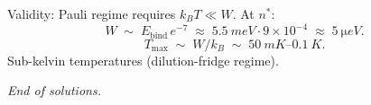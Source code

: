 \documentclass[11pt]{article}
\newcommand{\kB}{k_{B}}
\begin{document}
Validity: Pauli regime requires $\kB T\ll W$. At $n^*$:
\[
W \;\sim\; E_{\text{bind}}\,e^{-7} \;\approx\; \SI{5.5}{meV}\cdot 9\times 10^{-4} \;\approx\; \SI{5}{\micro eV}.
\]
\begin{equation}
\boxed{\;T_{\max}\;\sim\;W/\kB\;\sim\;\SI{50}{mK}\text{--}\SI{0.1}{K}.\;}
\label{eq:Tmax}
\end{equation}
Sub-kelvin temperatures (dilution-fridge regime).

\bigskip\noindent\emph{End of solutions.}
\end{document}
